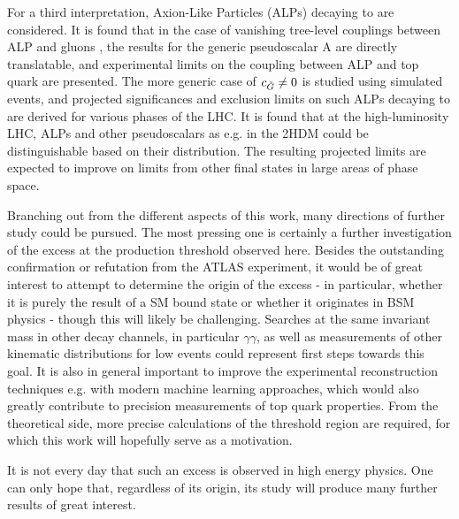 For a third interpretation, Axion-Like Particles (ALPs) decaying to \ttbar are considered. It is found that in the case of vanishing tree-level couplings between ALP and gluons \cG, the results for the generic pseudoscalar A are directly translatable, and experimental limits on the coupling between ALP and top quark are presented. The more generic case of $c_{\tilde{G}} \neq 0$ is studied using simulated events, and projected significances and exclusion limits on such ALPs decaying to \ttbar are derived for various phases of the LHC. It is found that at the high-luminosity LHC, ALPs and other pseudoscalars as e.g. in the 2HDM could be distinguishable based on their \mtt distribution. The resulting projected limits are expected to improve on limits from other final states in large areas of phase space.

\smallskip

Branching out from the different aspects of this work, many directions of further study could be pursued. The most pressing one is certainly a further investigation of the excess at the \ttbar production threshold observed here. Besides the outstanding confirmation or refutation from the ATLAS experiment, it would be of great interest to attempt to determine the origin of the excess - in particular, whether it is purely the result of a SM bound state or whether it originates in BSM physics - though this will likely be challenging. Searches at the same invariant mass in other decay channels, in particular $\gamma\gamma$, as well as measurements of other kinematic distributions for low \mtt events could represent first steps towards this goal. It is also in general important to improve the experimental \ttbar reconstruction techniques e.g. with modern machine learning approaches, which would also greatly contribute to precision measurements of top quark properties. From the theoretical side, more precise calculations of the \ttbar threshold region are required, for which this work will hopefully serve as a motivation.

It is not every day that such an excess is observed in high energy physics. One can only hope that, regardless of its origin, its study will produce many further results of great interest.

